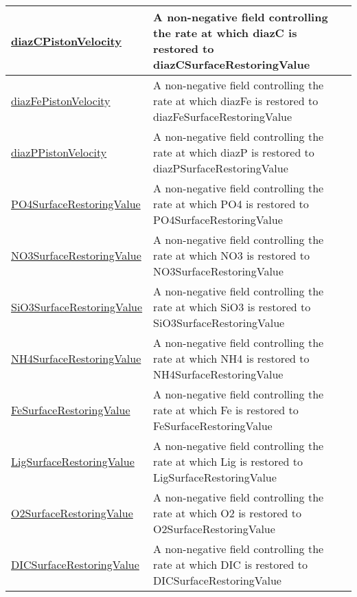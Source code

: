 {\begin{center}
\begin{longtable}{| p{2.0in} | p{4.0in} |}
    \hline
    \hyperref[subsec:var_sec_forcing_diazCPistonVelocity]{diazCPistonVelocity} & A non-negative field controlling the rate at which diazC is restored to diazCSurfaceRestoringValue \\
    \hline
    \hyperref[subsec:var_sec_forcing_diazFePistonVelocity]{diazFePistonVelocity} & A non-negative field controlling the rate at which diazFe is restored to diazFeSurfaceRestoringValue \\
    \hline
    \hyperref[subsec:var_sec_forcing_diazPPistonVelocity]{diazPPistonVelocity} & A non-negative field controlling the rate at which diazP is restored to diazPSurfaceRestoringValue \\
    \hline
    \hyperref[subsec:var_sec_forcing_PO4SurfaceRestoringValue]{PO4SurfaceRestoringValue} & A non-negative field controlling the rate at which PO4 is restored to PO4SurfaceRestoringValue \\
    \hline
    \hyperref[subsec:var_sec_forcing_NO3SurfaceRestoringValue]{NO3SurfaceRestoringValue} & A non-negative field controlling the rate at which NO3 is restored to NO3SurfaceRestoringValue \\
    \hline
    \hyperref[subsec:var_sec_forcing_SiO3SurfaceRestoringValue]{SiO3SurfaceRestoringValue} & A non-negative field controlling the rate at which SiO3 is restored to SiO3SurfaceRestoringValue \\
    \hline
    \hyperref[subsec:var_sec_forcing_NH4SurfaceRestoringValue]{NH4SurfaceRestoringValue} & A non-negative field controlling the rate at which NH4 is restored to NH4SurfaceRestoringValue \\
    \hline
    \hyperref[subsec:var_sec_forcing_FeSurfaceRestoringValue]{FeSurfaceRestoringValue} & A non-negative field controlling the rate at which Fe is restored to FeSurfaceRestoringValue \\
    \hline
    \hyperref[subsec:var_sec_forcing_LigSurfaceRestoringValue]{LigSurfaceRestoringValue} & A non-negative field controlling the rate at which Lig is restored to LigSurfaceRestoringValue \\
    \hline
    \hyperref[subsec:var_sec_forcing_O2SurfaceRestoringValue]{O2SurfaceRestoringValue} & A non-negative field controlling the rate at which O2 is restored to O2SurfaceRestoringValue \\
    \hline
    \hyperref[subsec:var_sec_forcing_DICSurfaceRestoringValue]{DICSurfaceRestoringValue} & A non-negative field controlling the rate at which DIC is restored to DICSurfaceRestoringValue \\

\end{longtable}
\end{center}}
